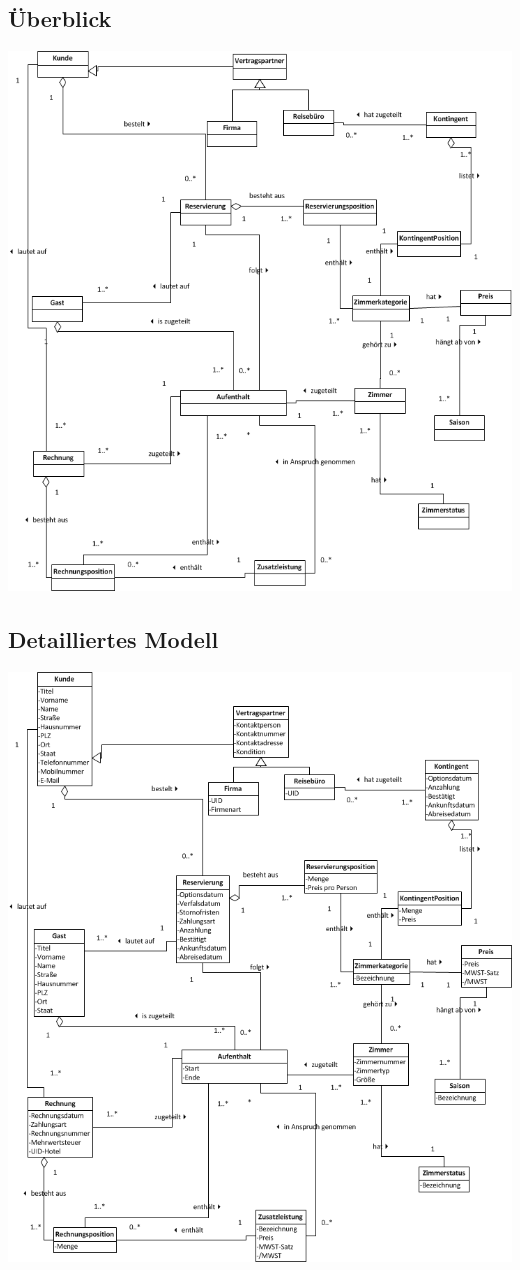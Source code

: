 \documentclass[10pt,a4paper,titlepage]{article}
\begin{document}
\subsection{Überblick}
\includegraphics[width=\linewidth]{Images/Domaenenmodell_Uebersicht.png}
\subsection{Detailliertes Modell}
\includegraphics[width=\linewidth]{Images/Domaenenmodell.png}
\end{document}
